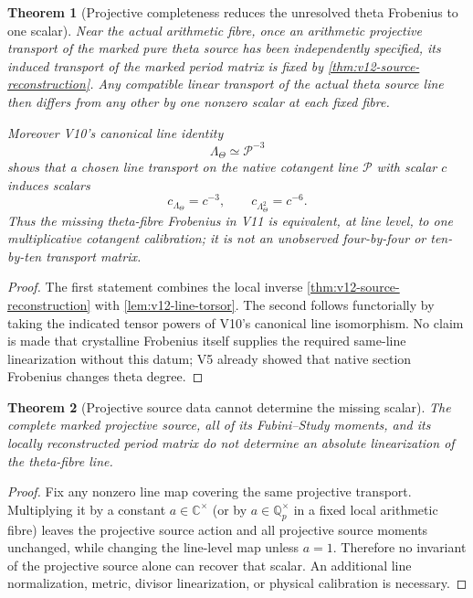 \documentclass[11pt]{article}
\newtheorem{theorem}{Theorem}[section]
\theoremstyle{definition}
\theoremstyle{remark}
\begin{document}
\begin{theorem}[Projective completeness reduces the unresolved theta Frobenius to one scalar]
\label{thm:v12-line-scalar}
Near the actual arithmetic fibre, once an arithmetic projective transport of
the marked pure theta source has been independently specified, its induced
transport of the marked period matrix is fixed by
\cref{thm:v12-source-reconstruction}.  Any compatible linear transport of the
actual theta source line then differs from any other by one nonzero scalar at
each fixed fibre.

Moreover V10's canonical line identity
\[
 \Lambda_\Theta\simeq\mathscr P^{-3}
\]
shows that a chosen line transport on the native cotangent line \(\mathscr P\)
with scalar \(c\) induces scalars
\begin{equation}
 \boxed{
 c_{\Lambda_\Theta}=c^{-3},
 \qquad
 c_{\Lambda_\Theta^2}=c^{-6}.}
 \label{eq:v12-line-weight}
\end{equation}
Thus the missing theta-fibre Frobenius in V11 is equivalent, at line level, to
one multiplicative cotangent calibration; it is not an unobserved
four-by-four or ten-by-ten transport matrix.
\end{theorem}
\begin{proof}
The first statement combines the local inverse
\cref{thm:v12-source-reconstruction} with
\cref{lem:v12-line-torsor}.  The second follows functorially by taking the
indicated tensor powers of V10's canonical line isomorphism.  No claim is made
that crystalline Frobenius itself supplies the required same-line
linearization without this datum; V5 already showed that native section
Frobenius changes theta degree.
\end{proof}

\begin{theorem}[Projective source data cannot determine the missing scalar]
\label{cth:v12-projective-no-scalar}
The complete marked projective source, all of its Fubini--Study moments, and
its locally reconstructed period matrix do not determine an absolute
linearization of the theta-fibre line.
\end{theorem}
\begin{proof}
Fix any nonzero line map covering the same projective transport.  Multiplying
it by a constant \(a\in\mathbb C^\times\) (or by \(a\in\mathbb Q_p^\times\)
in a fixed local arithmetic fibre) leaves the projective source action and all
projective source moments unchanged, while changing the line-level map unless
\(a=1\).  Therefore no invariant of the projective source alone can recover
that scalar.  An additional line normalization, metric, divisor linearization,
or physical calibration is necessary.
\end{proof}
\end{document}
